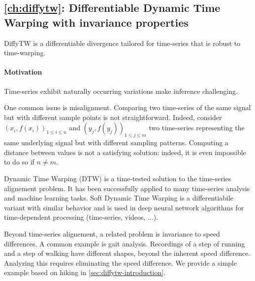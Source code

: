 


\subsection*{\cref{ch:diffytw}: Differentiable Dynamic Time Warping with invariance properties}
DiffyTW is a differentiable divergence tailored for time-series that is robust to time-warping.

\paragraph{Motivation}
Time-series exhibit naturally occurring variations make inference challenging.

One common issue is misalignment. Comparing two time-series of the same signal but with different sample points is not straightforward. Indeed, consider $(x_i, f(x_i))_{1\leq i\leq n}$ and $(y_j, f(y_j))_{1 \leq j \leq m}$ two time-series representing the same underlying signal but with different sampling patterns. Computing a distance between values is not a satisfying solution: indeed, it is even impossible to do so if $n\neq m$.

Dynamic Time Warping (DTW) is a time-tested solution to the time-series alignement problem. It has been successfully applied to many time-series analysis and machine learning tasks. Soft Dynamic Time Warping is a differentiabile variant with similar behavior and is used in deep neural network algorithms for time-dependent processing (time-series, videos, ...).

Beyond time-series alignement, a related problem is invariance to speed differences. A common example is gait analysis. Recordings of a step of running and a step of walking have different shapes, beyond the inherent speed difference. Analyzing this requires eliminating the speed difference. We provide a simple example based on hiking in \cref{sec:diffytw-introduction}.

